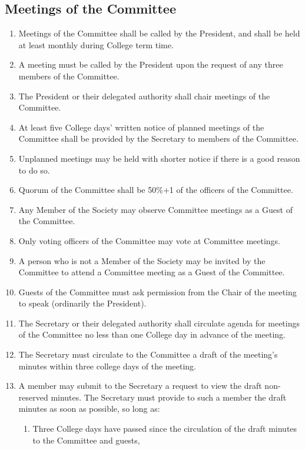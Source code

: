 \documentclass[a4paper]{tufte-handout}
\newcommand{\policyOffset}{12pt}
\newcommand{\policyBye}[2][\policyOffset]{\marginnote[#1]{\textsc{Bye-laws \S#2}}}
\begin{document}
\subsection{Meetings of the Committee}
\begin{enumerate}[resume]
    \item Meetings of the Committee shall be called by the President, and shall be held at least monthly during College term time.
    \item A meeting must be called by the President upon the request of any three members of the Committee.
    \item The President or their delegated authority shall chair meetings of the Committee.
    \item At least five College days' written notice of planned meetings of the Committee shall be provided by the Secretary to members of the Committee.
    \item Unplanned meetings may be held with shorter notice if there is a good reason to do so.
        \item \policyBye{B11} Quorum of the Committee shall be 50\%+1 of the officers of the Committee.
	\item Any Member of the Society may observe Committee meetings as a Guest of the Committee.
    \item Only voting officers of the Committee may vote at Committee meetings.
    \item A person who is not a Member of the Society may be invited by the Committee to attend a Committee meeting as a Guest of the Committee.
    \item Guests of the Committee must ask permission from the Chair of the meeting to speak (ordinarily the President).
    \item The Secretary or their delegated authority shall circulate agenda for meetings of the Committee no less than one College day in advance of the meeting.
    \item The Secretary must circulate to the Committee a draft of the meeting's minutes within three college days of the meeting.
    \item A member may submit to the Secretary a request to view the draft non-reserved minutes. The Secretary must provide to such a member the draft minutes as soon as possible, so long as:
        \begin{enumerate}
            \item Three College days have passed since the circulation of the draft minutes to the Committee and guests,

\end{enumerate}
\end{enumerate}
\end{document}
